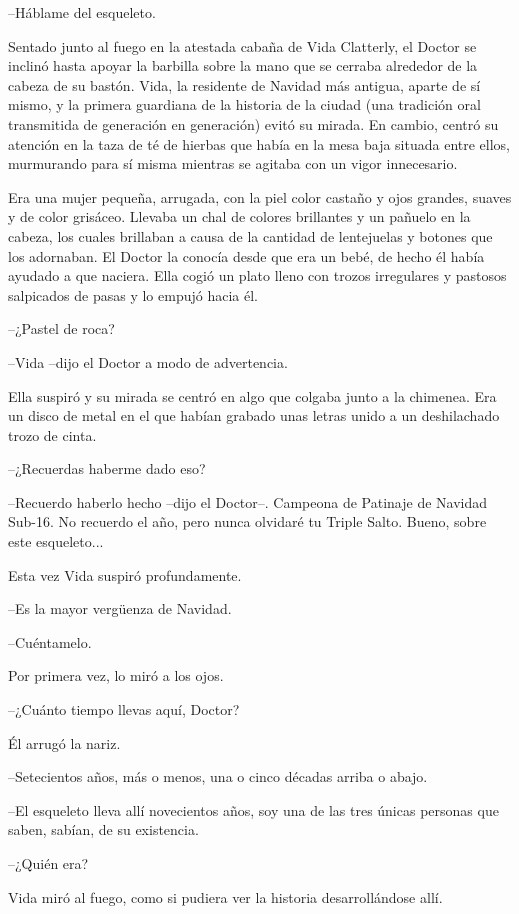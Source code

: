 --Háblame del esqueleto.

Sentado junto al fuego en la atestada cabaña de Vida Clatterly, el Doctor se inclinó hasta apoyar la barbilla sobre la mano que se cerraba alrededor de la cabeza de su bastón. Vida, la residente de Navidad más antigua, aparte de sí mismo, y la primera guardiana de la historia de la ciudad (una tradición oral transmitida de generación en generación) evitó su mirada. En cambio, centró su atención en la taza de té de hierbas que había en la mesa baja situada entre ellos, murmurando para sí misma mientras se agitaba con un vigor innecesario.

Era una mujer pequeña, arrugada, con la piel color castaño y ojos grandes, suaves y de color grisáceo. Llevaba un chal de colores brillantes y un pañuelo en la cabeza, los cuales brillaban a causa de la cantidad de lentejuelas y botones que los adornaban. El Doctor la conocía desde que era un bebé, de hecho él había ayudado a que naciera. Ella cogió un plato lleno con trozos irregulares y pastosos salpicados de pasas y lo empujó hacia él.

--¿Pastel de roca?

--Vida --dijo el Doctor a modo de advertencia.

Ella suspiró y su mirada se centró en algo que colgaba junto a la chimenea. Era un disco de metal en el que habían grabado unas letras unido a un deshilachado trozo de cinta.

--¿Recuerdas haberme dado eso?

--Recuerdo haberlo hecho --dijo el Doctor--. Campeona de Patinaje de Navidad Sub-16. No recuerdo el año, pero nunca olvidaré tu Triple Salto. Bueno, sobre este esqueleto...

Esta vez Vida suspiró profundamente. 

--Es la mayor vergüenza de Navidad.

--Cuéntamelo.

Por primera vez, lo miró a los ojos. 

--¿Cuánto tiempo llevas aquí, Doctor?

Él arrugó la nariz. 

--Setecientos años, más o menos, una o cinco décadas arriba o abajo.

--El esqueleto lleva allí novecientos años, soy una de las tres únicas personas que saben, sabían, de su existencia.

--¿Quién era?

Vida miró al fuego, como si pudiera ver la historia desarrollándose allí. 


